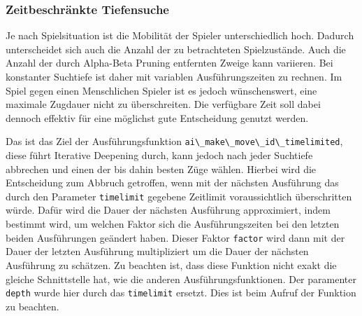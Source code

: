 \hypertarget{zeitbeschruxe4nkte-tiefensuche}{%
\subsubsection{Zeitbeschränkte
Tiefensuche}\label{zeitbeschruxe4nkte-tiefensuche}}

Je nach Spielsituation ist die Mobilität der Spieler unterschiedlich
hoch. Dadurch unterscheidet sich auch die Anzahl der zu betrachteten
Spielzustände. Auch die Anzahl der durch Alpha-Beta Pruning entfernten
Zweige kann variieren. Bei konstanter Suchtiefe ist daher mit variablen
Ausführungszeiten zu rechnen. Im Spiel gegen einen Menschlichen Spieler
ist es jedoch wünschenswert, eine maximale Zugdauer nicht zu
überschreiten. Die verfügbare Zeit soll dabei dennoch effektiv für eine
möglichst gute Entscheidung genutzt werden.

Das ist das Ziel der Ausführungsfunktion
\passthrough{\lstinline!ai\_make\_move\_id\_timelimited!}, diese führt
Iterative Deepening durch, kann jedoch nach jeder Suchtiefe abbrechen
und einen der bis dahin besten Züge wählen. Hierbei wird die
Entscheidung zum Abbruch getroffen, wenn mit der nächsten Ausführung das
durch den Parameter \passthrough{\lstinline!timelimit!} gegebene
Zeitlimit voraussichtlich überschritten würde. Dafür wird die Dauer der
nächsten Ausführung approximiert, indem bestimmt wird, um welchen Faktor
sich die Ausführungszeiten bei den letzten beiden Ausführungen geändert
haben. Dieser Faktor \passthrough{\lstinline!factor!} wird dann mit der
Dauer der letzten Ausführung multipliziert um die Dauer der nächsten
Ausführung zu schätzen. Zu beachten ist, dass diese Funktion nicht exakt
die gleiche Schnittstelle hat, wie die anderen Ausführungsfunktionen.
Der paramenter \passthrough{\lstinline!depth!} wurde hier durch das
\passthrough{\lstinline!timelimit!} ersetzt. Dies ist beim Aufruf der
Funktion zu beachten.

